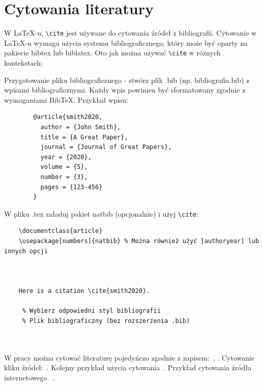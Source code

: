 


\section{Cytowania literatury}

W LaTeX-u, \texttt{\textbackslash cite} jest używane do cytowania źródeł z bibliografii. Cytowanie w LaTeX-u wymaga użycia systemu bibliograficznego, który może być oparty na pakiecie bibtex lub biblatex. Oto jak można używać \texttt{\textbackslash cite} w różnych kontekstach:

Przygotowanie pliku bibliograficznego - stwórz plik .bib (np. bibliografia.bib) z wpisami bibliograficznymi. Każdy wpis powinien być sformatowany zgodnie z wymaganiami BibTeX. Przykład wpisu:
\begin{verbatim}
        @article{smith2020,
          author = {John Smith},
          title = {A Great Paper},
          journal = {Journal of Great Papers},
          year = {2020},
          volume = {5},
          number = {3},
          pages = {123-456}
        }
        \end{verbatim}

W pliku .tex załaduj pakiet natbib (opcjonalnie) i użyj \texttt{\textbackslash cite}:

\begin{verbatim}
    \documentclass{article}
    \usepackage[numbers]{natbib} % Można również użyć [authoryear] lub innych opcji

    

    Here is a citation \cite{smith2020}.

     % Wybierz odpowiedni styl bibliografii
     % Plik bibliograficzny (bez rozszerzenia .bib)

    

\end{verbatim}



W pracy można cytować literaturę pojedyńczo zgodnie z zapisem:~\cite{ARM06}, \cite{WEI2026131611}. Cytowanie kliku źródeł:~\cite{ARM06,BuDo03,BuDoVa03,PeDa04}. Kolejny przykład użycia cytowania~\cite{Dil00,Lam92}. Przykład cytowania źródła internetowego~\cite{example2024} \cite{MendeleyExample}.

